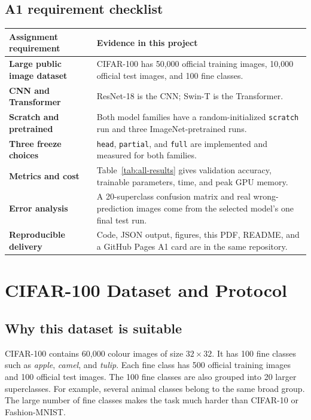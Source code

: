 \documentclass[oneside]{hcmut-report}
\begin{document}
\subsection*{A1 requirement checklist}
\noindent\begin{tabularx}{\textwidth}{>{\bfseries}p{3.4cm}X}\toprule
\textbf{Assignment requirement} & \textbf{Evidence in this project} \\\midrule
Large public image dataset & CIFAR-100 has 50,000 official training images, 10,000 official test images, and 100 fine classes. \\
CNN and Transformer & ResNet-18 is the CNN; Swin-T is the Transformer. \\
Scratch and pretrained & Both model families have a random-initialized \texttt{scratch} run and three ImageNet-pretrained runs. \\
Three freeze choices & \texttt{head}, \texttt{partial}, and \texttt{full} are implemented and measured for both families. \\
Metrics and cost & Table~\ref{tab:all-results} gives validation accuracy, trainable parameters, time, and peak GPU memory. \\
Error analysis & A 20-superclass confusion matrix and real wrong-prediction images come from the selected model's one final test run. \\
Reproducible delivery & Code, JSON output, figures, this PDF, README, and a GitHub Pages A1 card are in the same repository. \\\bottomrule
\end{tabularx}

\clearpage
\section{CIFAR-100 Dataset and Protocol}
\subsection{Why this dataset is suitable}
CIFAR-100 contains 60,000 colour images of size $32\times32$. It has 100 fine classes such as \textit{apple}, \textit{camel}, and \textit{tulip}. Each fine class has 500 official training images and 100 official test images. The 100 fine classes are also grouped into 20 larger superclasses. For example, several animal classes belong to the same broad group. The large number of fine classes makes the task much harder than CIFAR-10 or Fashion-MNIST.
\end{document}
